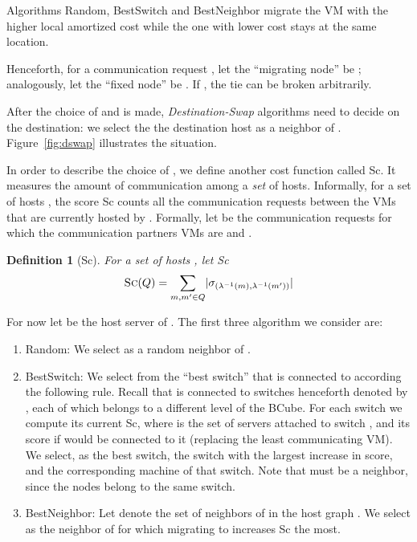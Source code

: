 \documentclass[conference]{IEEEtran}
\newtheorem{definition}{Definition}
\def\abs#1{\lvert #1 \rvert}
\begin{document}
Algorithms {\sc Random}, {\sc BestSwitch} and {\sc BestNeighbor} migrate the VM with the higher local amortized cost while the one with lower cost stays at the same location.






Henceforth, for a communication request , let the ``migrating node''  be ;
analogously, let the ``fixed node'' be . If , the tie can be broken arbitrarily.

After the choice of  and  is made, \emph{Destination-Swap} algorithms need to decide
on the destination: we select the the destination host  as a neighbor of . Figure~\ref{fig:dswap} illustrates the situation.


In order to describe the choice of , we define another cost function called {\sc Sc}. It measures the amount of communication among a \emph{set} of hosts.
Informally, for a set of hosts , the score {\sc Sc} counts all the communication requests between the VMs that are currently hosted by . Formally,
let  be the communication requests for which the communication partners VMs are  and .
\begin{definition}[{\sc Sc}]\label{def:scoreServers}
For a set of hosts , let {\sc Sc}
\begin {align}
\text{\sc Sc}(Q) =  \sum_{m, m' \in Q} \abs{\sigma_{(\lambda^{-1}(m), \lambda^{-1}(m'))}}
\end {align}
\end{definition}

For now let  be the host server of .  The first three algorithm we consider are:
\begin{enumerate}
\item {\sc Random:} We select  as a random neighbor of .
\item {\sc BestSwitch:} We select  from the ``best switch'' that  is connected to according the following rule.
Recall that  is connected to 
switches henceforth denoted by , each of which belongs to a different level of the BCube. For each switch  we compute its
current {\sc Sc}, where  is the set of servers attached to switch , and its score if  would be connected to it (replacing the least communicating VM).
We select, as the best switch, the switch with the largest increase in score, and the corresponding machine  of that switch.
Note that   must be a neighbor, since the nodes belong to the same switch.
\item {\sc BestNeighbor:} Let  denote the set of neighbors of  in the host graph . We select  as the neighbor of  for which
migrating  to   increases {\sc Sc} the most.
\end{enumerate}
\end{document}
